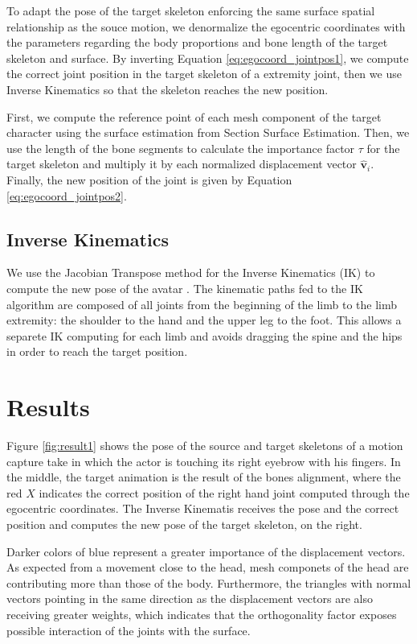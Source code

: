 \documentclass{vgtc}
\begin{document}
To adapt the pose of the target skeleton enforcing the same surface
spatial relationship as the souce motion, we denormalize the egocentric
coordinates with the parameters regarding the body proportions and bone
length of the target skeleton and surface. By inverting Equation
\ref{eq:egocoord_jointpos1}, we compute the correct joint position in
the target skeleton of a extremity joint, then we use Inverse Kinematics
so that the skeleton reaches the new position.

First, we compute the reference point of each mesh component of the
target character using the surface estimation from Section Surface
Estimation. Then, we use the length of the bone segments to calculate
the importance factor \(\tau\) for the target skeleton and multiply it
by each normalized displacement vector \(\mathbf{\hat{v}}_{i}\).
Finally, the new position of the joint is given by Equation
\ref{eq:egocoord_jointpos2}.

\subsection{Inverse Kinematics}\label{inverse-kinematics}

We use the Jacobian Transpose method for the Inverse Kinematics (IK) to
compute the new pose of the avatar \cite{buss}. The kinematic paths fed
to the IK algorithm are composed of all joints from the beginning of the
limb to the limb extremity: the shoulder to the hand and the upper leg
to the foot. This allows a separete IK computing for each limb and
avoids dragging the spine and the hips in order to reach the target
position.


    \section{Results}\label{results}

Figure \ref{fig:result1} shows the pose of the source and target
skeletons of a motion capture take in which the actor is touching its
right eyebrow with his fingers. In the middle, the target animation is
the result of the bones alignment, where the red \(X\) indicates the
correct position of the right hand joint computed through the egocentric
coordinates. The Inverse Kinematis receives the pose and the correct
position and computes the new pose of the target skeleton, on the right.

Darker colors of blue represent a greater importance of the displacement
vectors. As expected from a movement close to the head, mesh componets
of the head are contributing more than those of the body. Furthermore,
the triangles with normal vectors pointing in the same direction as the
displacement vectors are also receiving greater weights, which indicates
that the orthogonality factor exposes possible interaction of the joints
with the surface.
\end{document}

